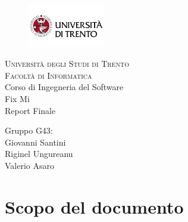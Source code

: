 \documentclass{report}
\begin{document}
	
	
	\begin{titlepage}
		\begin{figure}[t]
			\centering\includegraphics[width=0.3\textwidth]{images/unitn-logo}
		\end{figure}
		\begin{center}
			\textsc{ \LARGE{Università degli Studi di Trento \\}}
			\textsc{ \LARGE{Facoltà di Informatica\\ }}
			\textnormal{ \LARGE{Corso di Ingegneria del Software\\}}
			\vspace{30mm}
			\fontsize{10mm}{7mm}\selectfont 
			\textup{Fix Mi \\ Report Finale}\\
		\end{center}
		
		\vspace{25mm}
		
		\centering
		\large Gruppo G43: \\ Giovanni Santini\\ Riginel Ungureanu \\ Valerio Asaro
		
		\vspace{20mm}
		
		
	\end{titlepage}
	
	
	
	
	\pagestyle{fancy}
	\fancyhead[R]{\chaptername\ \thechapter}  %
	
	\tableofcontents
	\newpage
	
	
	
	\section{Scopo del documento}
	
\end{document}

